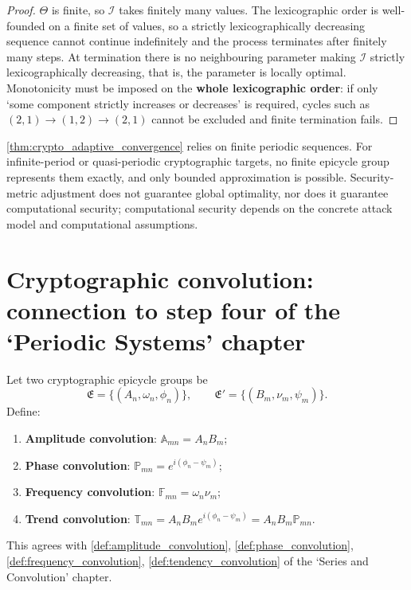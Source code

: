 \begin{proof}
$\Theta$ is finite, so $\mathcal I$ takes finitely many values. The lexicographic order is well-founded on a finite set of values, so a strictly lexicographically decreasing sequence cannot continue indefinitely and the process terminates after finitely many steps. At termination there is no neighbouring parameter making $\mathcal I$ strictly lexicographically decreasing, that is, the parameter is locally optimal. Monotonicity must be imposed on the \textbf{whole lexicographic order}: if only `some component strictly increases or decreases' is required, cycles such as $(2,1)\to(1,2)\to(2,1)$ cannot be excluded and finite termination fails.
\end{proof}

\begin{remark}\label{rem:crypto_adaptive_boundary}
\cref{thm:crypto_adaptive_convergence} relies on finite periodic sequences. For infinite-period or quasi-periodic cryptographic targets, no finite epicycle group represents them exactly, and only bounded approximation is possible. Security-metric adjustment does not guarantee global optimality, nor does it guarantee computational security; computational security depends on the concrete attack model and computational assumptions.
\end{remark}

\section{Cryptographic convolution: connection to step four of the `Periodic Systems' chapter}
\label{sec:crypto_convolution}

\begin{definition}\label{def:crypto_convolution_types}
Let two cryptographic epicycle groups be
\[
\mathfrak E=\{(A_n,\omega_n,\phi_n)\},\qquad
\mathfrak E'=\{(B_m,\nu_m,\psi_m)\}.
\]
Define:
\begin{enumerate}[label=(\roman*)]
    \item \textbf{Amplitude convolution}: \(\mathbb A_{mn}=A_nB_m\);
    \item \textbf{Phase convolution}: \(\mathbb P_{mn}=e^{i(\phi_n-\psi_m)}\);
    \item \textbf{Frequency convolution}: \(\mathbb F_{mn}=\omega_n\nu_m\);
    \item \textbf{Trend convolution}: \(\mathbb T_{mn}=A_nB_m e^{i(\phi_n-\psi_m)}=A_nB_m\mathbb P_{mn}\).
\end{enumerate}
This agrees with \cref{def:amplitude_convolution}, \cref{def:phase_convolution}, \cref{def:frequency_convolution}, \cref{def:tendency_convolution} of the `Series and Convolution' chapter.
\end{definition}

